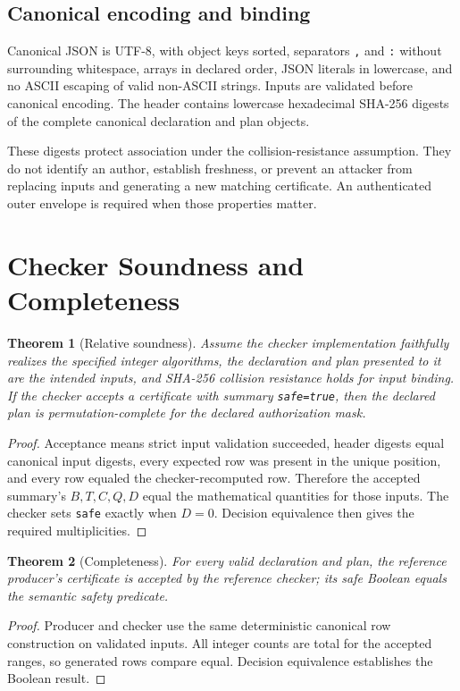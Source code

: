 \documentclass[11pt,onecolumn]{IEEEtran}
\newtheorem{theorem}{Theorem}
\newcommand{\code}[1]{\texttt{#1}}
\begin{document}
\subsection{Canonical encoding and binding}
Canonical JSON is UTF-8, with object keys sorted, separators \code{,} and \code{:} without surrounding whitespace, arrays in declared order, JSON literals in lowercase, and no ASCII escaping of valid non-ASCII strings.  Inputs are validated before canonical encoding.  The header contains lowercase hexadecimal SHA-256 digests of the complete canonical declaration and plan objects.

These digests protect association under the collision-resistance assumption.  They do not identify an author, establish freshness, or prevent an attacker from replacing inputs and generating a new matching certificate.  An authenticated outer envelope is required when those properties matter.

\section{Checker Soundness and Completeness}
\begin{theorem}[Relative soundness]
Assume the checker implementation faithfully realizes the specified integer algorithms, the declaration and plan presented to it are the intended inputs, and SHA-256 collision resistance holds for input binding.  If the checker accepts a certificate with summary \code{safe=true}, then the declared plan is permutation-complete for the declared authorization mask.
\end{theorem}
\begin{proof}
Acceptance means strict input validation succeeded, header digests equal canonical input digests, every expected row was present in the unique position, and every row equaled the checker-recomputed row.  Therefore the accepted summary's $B,T,C,Q,D$ equal the mathematical quantities for those inputs.  The checker sets \code{safe} exactly when $D=0$.  Decision equivalence then gives the required multiplicities.
\end{proof}

\begin{theorem}[Completeness]
For every valid declaration and plan, the reference producer's certificate is accepted by the reference checker; its safe Boolean equals the semantic safety predicate.
\end{theorem}
\begin{proof}
Producer and checker use the same deterministic canonical row construction on validated inputs.  All integer counts are total for the accepted ranges, so generated rows compare equal.  Decision equivalence establishes the Boolean result.
\end{proof}
\end{document}
